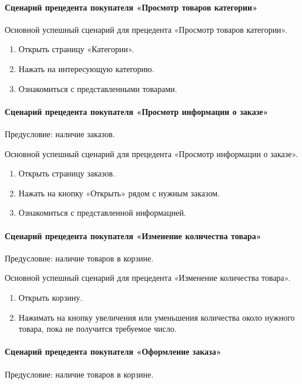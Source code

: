 \paragraph{Сценарий прецедента покупателя «Просмотр товаров категории»}

Основной успешный сценарий для прецедента «Просмотр товаров категории».
\begin{enumerate}
	\item Открыть страницу «Категории».
	\item Нажать на интересующую категорию.
	\item Ознакомиться с представленными товарами.
\end{enumerate}

\paragraph{Сценарий прецедента покупателя «Просмотр информации о заказе»}
Предусловие: наличие заказов.

Основной успешный сценарий для прецедента «Просмотр информации о заказе».
\begin{enumerate}
	\item Открыть страницу заказов.
	\item Нажать на кнопку «Открыть» рядом с нужным заказом.
	\item Ознакомиться с представленной информацией.
\end{enumerate}

\paragraph{Сценарий прецедента покупателя «Изменение количества товара»}
Предусловие: наличие товаров в корзине.

Основной успешный сценарий для прецедента «Изменение количества товара».
\begin{enumerate}
	\item Открыть корзину.
	\item Нажимать на кнопку увеличения или уменьшения количества около нужного товара, пока не получится требуемое число.
\end{enumerate}

\paragraph{Сценарий прецедента покупателя «Оформление заказа»}
Предусловие: наличие товаров в корзине.

